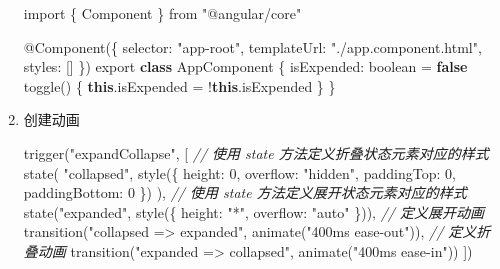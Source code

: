 \documentclass[
]{article}
\newenvironment{Shaded}{}{}
\newcommand{\AttributeTok}[1]{\textcolor[rgb]{0.49,0.56,0.16}{#1}}
\newcommand{\CommentTok}[1]{\textcolor[rgb]{0.38,0.63,0.69}{\textit{#1}}}
\newcommand{\DataTypeTok}[1]{\textcolor[rgb]{0.56,0.13,0.00}{#1}}
\newcommand{\DecValTok}[1]{\textcolor[rgb]{0.25,0.63,0.44}{#1}}
\newcommand{\FunctionTok}[1]{\textcolor[rgb]{0.02,0.16,0.49}{#1}}
\newcommand{\ImportTok}[1]{#1}
\newcommand{\KeywordTok}[1]{\textcolor[rgb]{0.00,0.44,0.13}{\textbf{#1}}}
\newcommand{\NormalTok}[1]{#1}
\newcommand{\OperatorTok}[1]{\textcolor[rgb]{0.40,0.40,0.40}{#1}}
\newcommand{\StringTok}[1]{\textcolor[rgb]{0.25,0.44,0.63}{#1}}
\begin{document}
\begin{enumerate}
\begin{Shaded}
\begin{Highlighting}[]
\ImportTok{import}\NormalTok{ \{ Component \} }\ImportTok{from} \StringTok{"@angular/core"}

\NormalTok{@}\FunctionTok{Component}\NormalTok{(\{}
  \DataTypeTok{selector}\OperatorTok{:} \StringTok{"app{-}root"}\OperatorTok{,}
  \DataTypeTok{templateUrl}\OperatorTok{:} \StringTok{"./app.component.html"}\OperatorTok{,}
  \DataTypeTok{styles}\OperatorTok{:}\NormalTok{ []}
\NormalTok{\})}
\ImportTok{export} \KeywordTok{class}\NormalTok{ AppComponent \{}
  \DataTypeTok{isExpended}\OperatorTok{:}\NormalTok{ boolean }\OperatorTok{=} \KeywordTok{false}
  \FunctionTok{toggle}\NormalTok{() \{}
    \KeywordTok{this}\OperatorTok{.}\AttributeTok{isExpended} \OperatorTok{=} \OperatorTok{!}\KeywordTok{this}\OperatorTok{.}\AttributeTok{isExpended}
\NormalTok{  \}}
\NormalTok{\}}
\end{Highlighting}
\end{Shaded}
\item
  创建动画

\begin{Shaded}
\begin{Highlighting}[]
\FunctionTok{trigger}\NormalTok{(}\StringTok{"expandCollapse"}\OperatorTok{,}\NormalTok{ [}
  \CommentTok{// 使用 state 方法定义折叠状态元素对应的样式}
  \FunctionTok{state}\NormalTok{(}
    \StringTok{"collapsed"}\OperatorTok{,}
    \FunctionTok{style}\NormalTok{(\{}
      \DataTypeTok{height}\OperatorTok{:} \DecValTok{0}\OperatorTok{,}
      \DataTypeTok{overflow}\OperatorTok{:} \StringTok{"hidden"}\OperatorTok{,}
      \DataTypeTok{paddingTop}\OperatorTok{:} \DecValTok{0}\OperatorTok{,}
      \DataTypeTok{paddingBottom}\OperatorTok{:} \DecValTok{0}
\NormalTok{    \})}
\NormalTok{  )}\OperatorTok{,}
  \CommentTok{// 使用 state 方法定义展开状态元素对应的样式}
  \FunctionTok{state}\NormalTok{(}\StringTok{"expanded"}\OperatorTok{,} \FunctionTok{style}\NormalTok{(\{ }\DataTypeTok{height}\OperatorTok{:} \StringTok{"*"}\OperatorTok{,} \DataTypeTok{overflow}\OperatorTok{:} \StringTok{"auto"}\NormalTok{ \}))}\OperatorTok{,}
  \CommentTok{// 定义展开动画}
  \FunctionTok{transition}\NormalTok{(}\StringTok{"collapsed =\textgreater{} expanded"}\OperatorTok{,} \FunctionTok{animate}\NormalTok{(}\StringTok{"400ms ease{-}out"}\NormalTok{))}\OperatorTok{,}
  \CommentTok{// 定义折叠动画}
  \FunctionTok{transition}\NormalTok{(}\StringTok{"expanded =\textgreater{} collapsed"}\OperatorTok{,} \FunctionTok{animate}\NormalTok{(}\StringTok{"400ms ease{-}in"}\NormalTok{))}
\NormalTok{])}
\end{Highlighting}
\end{Shaded}


\end{enumerate}
\end{document}
